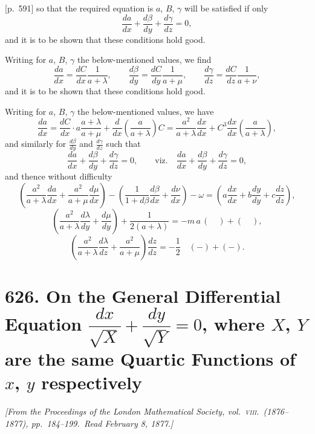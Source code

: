 \documentclass[11pt,a4paper]{book}
\begin{document}
\bigskip

[p.~591] so that the required equation is $a$, $B$, $\gamma$ will be satisfied if only
\[
\frac{da}{dx} + \frac{d\beta}{dy} + \frac{d\gamma}{dz} = 0,
\]
and it is to be shown that these conditions hold good.

Writing for $a$, $B$, $\gamma$ the below-mentioned values, we find
\[
\frac{da}{dx} = \frac{dC}{dx} \frac{1}{a + \lambda}, \qquad \frac{d\beta}{dy} = \frac{dC}{dy} \frac{1}{a + \mu}, \qquad \frac{d\gamma}{dz} = \frac{dC}{dz} \frac{1}{a + \nu},
\]
and it is to be shown that these conditions hold good.

Writing for $a$, $B$, $\gamma$ the below-mentioned values, we have
\[
\frac{da}{dx} = \frac{dC}{dx} \cdot a \frac{a + \lambda}{a + \mu} + \frac{d}{dx}\left(\frac{a}{a + \lambda}\right) C = \frac{a^2}{a + \lambda} \frac{dx}{dx} + C^3 \frac{dx}{dx} \left(\frac{a}{a + \lambda}\right),
\]
and similarly for $\frac{d\beta}{dy}$ and $\frac{d\gamma}{dz}$ such that
\[
\frac{da}{dx} + \frac{d\beta}{dy} + \frac{d\gamma}{dz} = 0, \qquad \text{viz.}\quad \frac{da}{dx} + \frac{d\beta}{dy} + \frac{d\gamma}{dz} = 0,
\]
and thence without difficulty
\[
\left(\frac{a^2}{a+\lambda} \frac{da}{dx} + \frac{a^2}{a+\mu} \frac{d\mu}{dx} \right) - \left(\frac{1}{1 + d\beta}\frac{d\beta}{dx} + \frac{d\nu}{dx}\right) - \omega = \left(a\frac{dx}{dx} + b\frac{dy}{dy} + c\frac{dz}{dz}\right),
\]
\[
\left(\frac{a^2}{a+\lambda} \frac{d\lambda}{dy} + \frac{d\mu}{dy}\right) + \frac{1}{2(a+\lambda)} = -m\,a\,\left( \quad \right) + \left( \quad \right),
\]
\[
\left(\frac{a^2}{a+\lambda} \frac{d\lambda}{dz} + \frac{a^2}{a+\mu}\right) \frac{dz}{dz} = -\frac{1}{2} \quad ( - ) + ( - ).
\]

\bigskip

\newpage
\section*{\textbf{626.} On the General Differential Equation $\dfrac{dx}{\sqrt{X}} + \dfrac{dy}{\sqrt{Y}} = 0$, where $X$, $Y$ are the same Quartic Functions of $x$, $y$ respectively}

\textit{[From the Proceedings of the London Mathematical Society, vol.\ \textsc{viii}.\ (1876--1877), pp.~184--199.\ Read February 8, 1877.]}
\end{document}
